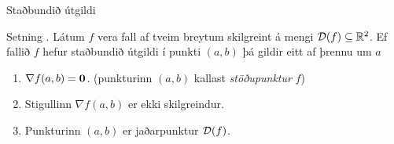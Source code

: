 \begin{frame}{Staðbundið útgildi} 

\begin {block}{Setning \kaflanr.}
 Látum $f$ vera fall af tveim breytum
skilgreint á mengi ${\cal D}(f)\subseteq {\mathbb R}^2$.  Ef fallið $f$ hefur
staðbundið útgildi í punkti $(a,b)$ þá gildir eitt af þrennu um $a$
\begin {enumerate}
 \item  $\nabla f(a,b)=\mbox{${\bf 0}$}$. \qquad (punkturinn $(a,b)$ kallast {\em \color{red}
     stöðupunktur} $f$) 
\item Stigullinn $\nabla f(a,b)$ er ekki skilgreindur.
\item Punkturinn $(a,b)$ er jaðarpunktur ${\cal D}(f)$.
\end {enumerate}

\end{block}

\end{frame}

